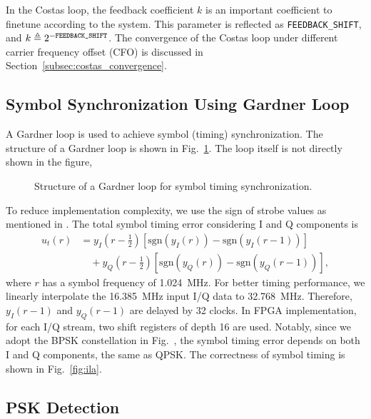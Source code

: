 \documentclass[journal,twoside]{IEEEtran}
\begin{document}
      In the Costas loop,
      the feedback coefficient $k$ is an important coefficient to finetune according to the system.
      This parameter is reflected as \texttt{FEEDBACK\_SHIFT}, and $k\triangleq2^{-\text{\texttt{FEEDBACK\_SHIFT}}}$.
      The convergence of the Costas loop under different carrier frequency offset (CFO) is discussed in Section~\ref{subsec:costas_convergence}.

    \subsection{Symbol Synchronization Using Gardner Loop}

      A Gardner loop \cite{gardner1986bpsk} is used to achieve symbol (timing) synchronization.
      The structure of a Gardner loop is shown in Fig.~\ref{fig:gardner_loop}.
      The loop itself is not directly shown in the figure,
      \begin{figure}[htbp]
        
        \caption{Structure of a Gardner loop for symbol timing synchronization.}
        \label{fig:gardner_loop}
      \end{figure}

      To reduce implementation complexity, we use the sign of strobe values as mentioned in \cite{gardner1986bpsk}.
      The total symbol timing error considering I and Q components is
      \begin{equation}
        \begin{aligned}
          u_t(r)&=y_I(r-\tfrac12)\left[\mathrm{sgn}\left(y_I(r)\right)-\mathrm{sgn}\left(y_I(r-1)\right)\right] \\
          &\quad{}+y_Q(r-\tfrac12)\left[\mathrm{sgn}\left(y_Q(r)\right)-\mathrm{sgn}\left(y_Q(r-1)\right)\right],
        \end{aligned}
      \end{equation}
      where $r$ has a symbol frequency of \qty{1.024}{MHz}.
      For better timing performance, we linearly interpolate the \qty{16.385}{MHz} input I/Q data to \qty{32.768}{MHz}.
      Therefore, $y_I(r-1)$ and $y_Q(r-1)$ are delayed by 32 clocks.
      In FPGA implementation, for each I/Q stream, two shift registers of depth 16 are used.
      Notably, since we adopt the BPSK constellation in Fig.~,
      the symbol timing error depends on both I and Q components, the same as QPSK.
      The correctness of symbol timing is shown in Fig.~\ref{fig:ila}.

    \subsection{PSK Detection}
\end{document}
